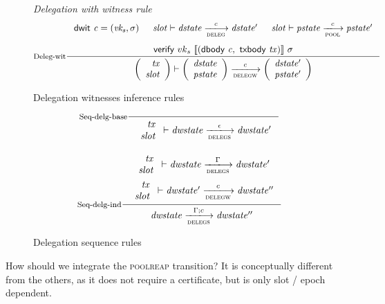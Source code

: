 \begin{figure}
  \emph{Delegation with witness rule}
  \begin{equation}
    \label{eq:deleg-witnesses}
    \inference[Deleg-wit]
    { \dwit{c} = (\var{vk_s}, \sigma)
      & \var{slot} \vdash \var{dstate} \trans{deleg}{c} \var{dstate'}
      & \var{slot} \vdash \var{pstate} \trans{pool}{c} \var{pstate'}
      \\ ~ \\
      \verify{vk_s}{\serialised{(\dbody{c},~\txbody \var{tx})}}{\sigma}
    }
    { \left(
      \begin{array}{r}
        \var{tx} \\
        \var{slot}
      \end{array}
      \right)
      \vdash
      \left(
      \begin{array}{r}
        \var{dstate} \\
        \var{pstate}
      \end{array}
      \right)
      \trans{delegw}{c}
      \left(
      \begin{array}{rcl}
        \var{dstate'} \\
        \var{pstate'}
      \end{array}
      \right)
    }
  \end{equation}
  \caption{Delegation witnesses inference rules}
  \label{fig:rules:delegationw}
\end{figure}

\begin{figure}
  \begin{equation}
    \inference[Seq-delg-base]
    {}
    {
      \begin{array}{r}
        \var{tx}\\
        \var{slot}
      \end{array}
      \vdash
      \var{dwstate}
      \trans{delegs}{\epsilon}
      \var{dwstate'}
    }
    \label{eq:rule:sequence-delegation-base}
  \end{equation}

  \begin{equation}
    \inference[Seq-delg-ind]
    {
      {
        \begin{array}{r}
          \var{tx}\\
          \var{slot}\\
        \end{array}
      }
      \vdash
      \var{dwstate}
      \trans{delegs}{\Gamma}
      \var{dwstate'}
    \\ ~ \\
    {
      \begin{array}{r}
        \var{tx}\\
        \var{slot}\\
      \end{array}
    }
    \vdash
      \var{dwstate'}
      \trans{delegw}{c}
      \var{dwstate''}
    }
    {
      \var{dwstate}
      \trans{delegs}{\Gamma; c}
      \var{dwstate''}
    }
    \label{eq:rule:sequence-delegation-inductive}
  \end{equation}
  \caption{Delegation sequence rules}
  \label{fig:rules:delegation-sequence}
\end{figure}

\begin{todo}
  How should we integrate the \textsc{poolreap} transition? It is conceptually
  different from the others, as it does not require a certificate, but is only
  slot / epoch dependent.
\end{todo}
